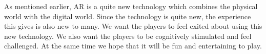 As mentioned earlier, AR is a quite new technology which combines the physical 
world with the digital world. Since the technology is quite new, the experience
this gives is also new to many. We want the players to feel exited about using
this new technology. We also want the players to be cognitively stimulated and
feel challenged. At the same time we hope that it will be fun and entertaining
to play.
